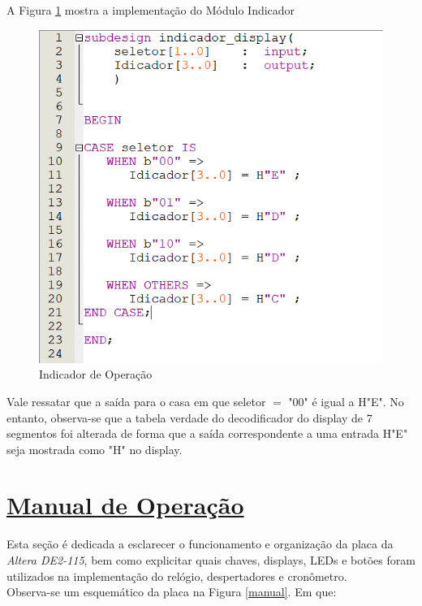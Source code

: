 \documentclass[14pt, oneside]{book}
\newcommand\tab[1][1cm]{\hspace*{#1}}
\theoremstyle{definition}
\begin{document}
                \tab A Figura \ref{indicador} mostra a implementação do Módulo Indicador
                
                    \begin{figure}[H]
                    \centering                    \includegraphics[scale = 0.9]{indicador_display.PNG}
                    \caption{Indicador de Operação}
                    \label{indicador}
                    \end{figure}
                Vale ressatar que a saída para o casa em que seletor $=$ "00" é igual a H"E". No entanto, observa-se que a tabela verdade do decodificador do display de $7$ segmentos foi alterada de forma que a saída correspondente a uma entrada H"E" seja mostrada como "H" no display.
                
                
                
         \chapter[Manual de Operação]{\hyperlink{toc}{Manual de Operação}}
                \tab Esta seção é dedicada a esclarecer o funcionamento e organização da placa da \textit{Altera DE2-115}, bem como explicitar quais chaves, displays, LEDs e botões foram utilizados na implementação do relógio, despertadores e cronômetro. \\
                \tab Observa-se um esquemático da placa na Figura \ref{manual}. Em que:
              
\end{document}
